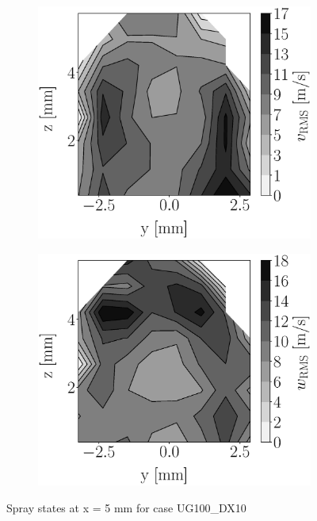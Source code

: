 \begin{figure}[h!]
\begin{subfigure}[b]{0.22\textwidth}
\end{subfigure}
   \hspace{0.17in}
\begin{subfigure}[b]{0.22\textwidth}
	\centering
   \includegraphics[scale=0.17]{./part2_developments/figures_ch5_resolved_JICF/injectors_SLI/uG100_dx10_x05_uy_rms_map.eps}
\end{subfigure}
   \hspace{0.17in}
\begin{subfigure}[b]{0.22\textwidth}
	\centering
   \includegraphics[scale=0.17]{./part2_developments/figures_ch5_resolved_JICF/injectors_SLI/uG100_dx10_x05_uz_rms_map.eps}
\end{subfigure}
\caption{Spray states at x = 5 mm for case UG100\_DX10}
\label{fig:injectors_sli_uG100_dx10_x05}
\end{figure}


